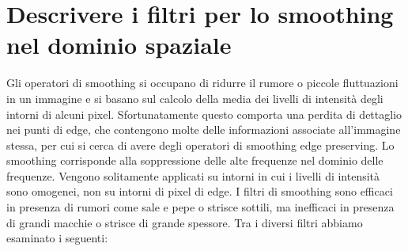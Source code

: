 \section{Descrivere i filtri per lo smoothing nel dominio spaziale}
Gli operatori di smoothing si occupano di ridurre il rumore o piccole fluttuazioni in un immagine e si basano sul calcolo della media dei livelli di intensità degli intorni di alcuni pixel. Sfortunatamente questo comporta una perdita di dettaglio nei punti di edge, che contengono molte delle informazioni associate all'immagine stessa, per cui si cerca di avere degli operatori di smoothing edge preserving. Lo smoothing corrisponde alla soppressione delle alte frequenze nel dominio delle frequenze. Vengono solitamente applicati su intorni in cui i livelli di intensità sono omogenei, non su intorni di pixel di edge. I filtri di smoothing sono efficaci in presenza di rumori come sale e pepe o strisce sottili, ma inefficaci in
presenza di grandi macchie o strisce di grande spessore. Tra i diversi filtri abbiamo esaminato i seguenti:
